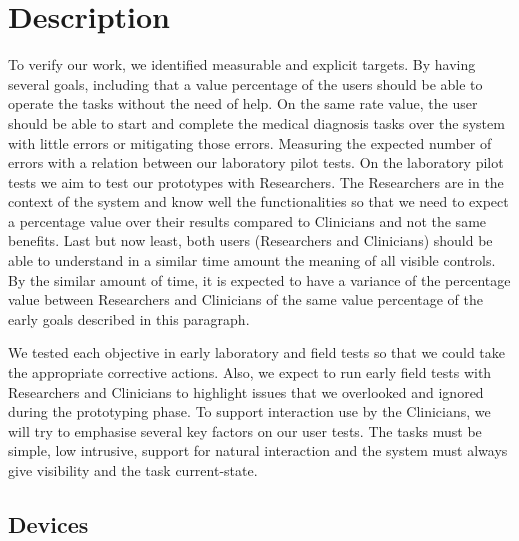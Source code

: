 
\section{Description}

To verify our work, we identified measurable and explicit targets. By having several goals, including that a value percentage of the users should be able to operate the tasks without the need of help. On the same rate value, the user should be able to start and complete the medical diagnosis tasks over the system with little errors or mitigating those errors. Measuring the expected number of errors with a relation between our laboratory pilot tests. On the laboratory pilot tests we aim to test our prototypes with Researchers. The Researchers are in the context of the system and know well the functionalities so that we need to expect a percentage value over their results compared to Clinicians and not the same benefits. Last but now least, both users (Researchers and Clinicians) should be able to understand in a similar time amount the meaning of all visible controls. By the similar amount of time, it is expected to have a variance of the percentage value between Researchers and Clinicians of the same value percentage of the early goals described in this paragraph.

We tested each objective in early laboratory and field tests so that we could take the appropriate corrective actions. Also, we expect to run early field tests with Researchers and Clinicians to highlight issues that we overlooked and ignored during the prototyping phase. To support interaction use by the Clinicians, we will try to emphasise several key factors on our user tests. The tasks must be simple, low intrusive, support for natural interaction and the system must always give visibility and the task current-state.

\clearpage


\subsection{Devices}

